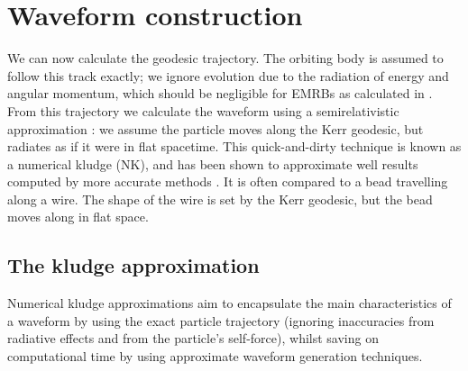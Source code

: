 \section{Waveform construction}\label{sec:Kludge}

We can now calculate the geodesic trajectory. The orbiting body is assumed to follow this track exactly; we ignore evolution due to the radiation of energy and angular momentum, which should be negligible for EMRBs as calculated in . From this trajectory we calculate the waveform using a semirelativistic approximation \citep{Ruffini1981}: we assume the particle moves along the Kerr geodesic, but radiates as if it were in flat spacetime. This quick-and-dirty technique is known as a numerical kludge (NK), and has been shown to approximate well results computed by more accurate methods \citep{Babak2007}. It is often compared to a bead travelling along a wire. The shape of the wire is set by the Kerr geodesic, but the bead moves along in flat space.

\subsection{The kludge approximation}

Numerical kludge approximations aim to encapsulate the main characteristics of a waveform by using the exact particle trajectory (ignoring inaccuracies from radiative effects and from the particle's self-force), whilst saving on computational time by using approximate waveform generation techniques.

